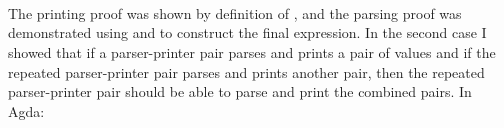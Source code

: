 \documentclass[12pt,a4paper,twoside,openright]{report}
\newcommand{\F}{\AgdaFunction}
\begin{document}
\begin{code}
\> \AgdaSymbol{:} 
\>[18]         \<%
\\
\>[4]\<[18]%
\>[18]  \AgdaSymbol{=}  \<%
\\
\>[18]\<[22]%
\>[22] \AgdaSymbol{=}  \<%
\\
\>[0]\<[18]%
\>[18] \<[22]%
\>[22] \AgdaFunction{[}  \AgdaFunction{]}       \<%
\end{code}

The printing proof was shown by definition of \F{liftM2}, and the parsing proof was demonstrated using \F{$\in$-parts} and \F{$\in$-map} to construct the final expression.  
In the second case I showed that if a parser-printer pair parses and prints a pair of values and if the repeated parser-printer pair parses and prints another pair, then the repeated parser-printer pair should be able to parse and print the combined pairs. In Agda:

\begin{code}
\> \AgdaSymbol{:} 
\>[18]         \<%
\\
\>[8]\<[18]%
\>[18]  \AgdaSymbol{=}  \<%
\\
\>[18]\<[22]%
\>[22] \AgdaSymbol{=}  \<%
\\
\>[0]\<[18]%
\>[18] \<[22]%
\>[22]  \AgdaInductiveConstructor{[]} \<%
\\
\>[18]\<[22]%
\>[22]         \<%
\\
\>[18]\<[22]%
\>[22]          \AgdaFunction{++}  \<%
\end{code}
\end{document}
